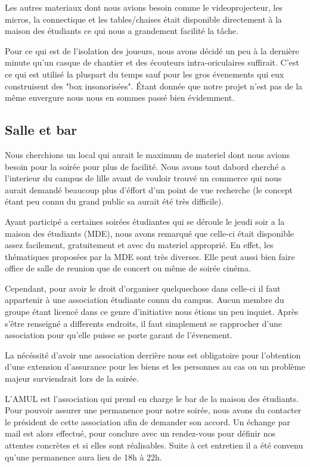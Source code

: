 Les autres materiaux dont nous avions besoin comme le videoprojecteur,
les micros, la connectique et les tables/chaises était disponible directement à
la maison des étudiants ce qui nous a grandement facilité la tâche.

Pour ce qui est de l'isolation des joueurs, nous avons décidé un peu à
la dernière minute qu'un casque de chantier et des écouteurs
intra-oriculaires suffirait. C'est ce qui est utilisé la pluspart du
temps sauf pour les gros évenements qui eux construisent des "box
insonorisées". Étant donnée que notre projet n'est pas de la même
envergure nous nous en sommes passé bien évidemment.

\subsection{Salle et bar}%
\label{sub:salle_et_bar}

Nous cherchions un local qui aurait le maximum de materiel dont nous
avions besoin pour la soirée pour plus de facilité. Nous avons tout
dabord cherché a l'interieur du campus de lille avant de vouloir trouvé
un commerce qui nous aurait demandé beaucoup plus d'éffort d'un point de
vue recherche (le concept étant peu connu du grand public sa aurait été
très difficile).

Ayant participé a certaines soirées étudiantes qui se déroule le jeudi
soir a la maison des étudiants (MDE), nous avons remarqué que celle-ci
était disponible assez facilement, gratuitement et avec du materiel
approprié. En effet, les thématiques proposées par la MDE sont très
diverses. Elle peut aussi bien faire office de salle de reunion que de
concert ou même de soirée cinéma.

Cependant, pour avoir le droit d'organiser quelquechose dans celle-ci il
faut appartenir à une association étudiante connu du campus. Aucun
membre du groupe étant licencé dans ce genre d'initiative nous étions un
peu inquiet. Après s'être renseigné a differents endroits, il faut
simplement se rapprocher d'une association pour qu'elle puisse se porte
garant de l'évenement.

La nécéssité d'avoir une association derrière nous est obligatoire pour
l'obtention d'une extension d'assurance pour les biens et les personnes
au cas ou un problème majeur surviendrait lors de la soirée.

L'AMUL est l'association qui prend en charge le bar de la maison des
étudiants.  Pour pouvoir assurer une permanence pour notre soirée, nous
avons du contacter le président de cette association afin de demander
son accord.  Un échange par mail est alors effectué, pour conclure avec
un rendez-vous pour définir nos attentes concrètes et si elles sont
réalisables. Suite à cet entretien il a été convenu qu'une permanence
aura lieu de 18h à 22h.

